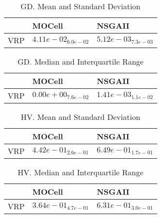 \documentclass{article}
\begin{document}
\begin{table}
\caption{GD. Mean and Standard Deviation}
\label{table: GD}
\centering
\begin{scriptsize}
\begin{tabular}{lll}
\hline & MOCell &  NSGAII\\
\hline 
VRP & \cellcolor{gray25}$  4.11e-02_{ 6.0e-02}$ & \cellcolor{gray95}$  5.12e-03_{ 7.3e-03}$ \\
\hline
\end{tabular}
\end{scriptsize}
\end{table}

\begin{table}
\caption{GD. Median and Interquartile Range}
\label{table: GD}
\centering
\begin{scriptsize}
\begin{tabular}{lll}
\hline & MOCell &  NSGAII\\
\hline 
VRP & \cellcolor{gray95}$  0.00e+00_{ 7.6e-02}$ & \cellcolor{gray25}$  1.41e-03_{ 1.1e-02}$ \\
\hline
\end{tabular}
\end{scriptsize}
\end{table}

\begin{table}
\caption{HV. Mean and Standard Deviation}
\label{table: HV}
\centering
\begin{scriptsize}
\begin{tabular}{lll}
\hline & MOCell &  NSGAII\\
\hline 
VRP & \cellcolor{gray25}$  4.42e-01_{ 2.6e-01}$ & \cellcolor{gray95}$  6.49e-01_{ 1.7e-01}$ \\
\hline
\end{tabular}
\end{scriptsize}
\end{table}

\begin{table}
\caption{HV. Median and Interquartile Range}
\label{table: HV}
\centering
\begin{scriptsize}
\begin{tabular}{lll}
\hline & MOCell &  NSGAII\\
\hline 
VRP & \cellcolor{gray25}$  3.64e-01_{ 4.7e-01}$ & \cellcolor{gray95}$  6.31e-01_{ 3.0e-01}$ \\
\hline
\end{tabular}
\end{scriptsize}
\end{table}
\end{document}
